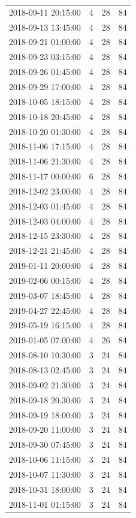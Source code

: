 \begin{tabular}{lrrr}
2018-09-11 20:15:00 & 4 & 28 & 84 \\
2018-09-13 13:45:00 & 4 & 28 & 84 \\
2018-09-21 01:00:00 & 4 & 28 & 84 \\
2018-09-23 03:15:00 & 4 & 28 & 84 \\
2018-09-26 01:45:00 & 4 & 28 & 84 \\
2018-09-29 17:00:00 & 4 & 28 & 84 \\
2018-10-05 18:15:00 & 4 & 28 & 84 \\
2018-10-18 20:45:00 & 4 & 28 & 84 \\
2018-10-20 01:30:00 & 4 & 28 & 84 \\
2018-11-06 17:15:00 & 4 & 28 & 84 \\
2018-11-06 21:30:00 & 4 & 28 & 84 \\
2018-11-17 00:00:00 & 6 & 28 & 84 \\
2018-12-02 23:00:00 & 4 & 28 & 84 \\
2018-12-03 01:45:00 & 4 & 28 & 84 \\
2018-12-03 04:00:00 & 4 & 28 & 84 \\
2018-12-15 23:30:00 & 4 & 28 & 84 \\
2018-12-21 21:45:00 & 4 & 28 & 84 \\
2019-01-11 20:00:00 & 4 & 28 & 84 \\
2019-02-06 00:15:00 & 4 & 28 & 84 \\
2019-03-07 18:45:00 & 4 & 28 & 84 \\
2019-04-27 22:45:00 & 4 & 28 & 84 \\
2019-05-19 16:15:00 & 4 & 28 & 84 \\
2019-01-05 07:00:00 & 4 & 26 & 84 \\
2018-08-10 10:30:00 & 3 & 24 & 84 \\
2018-08-13 02:45:00 & 3 & 24 & 84 \\
2018-09-02 21:30:00 & 3 & 24 & 84 \\
2018-09-18 20:30:00 & 3 & 24 & 84 \\
2018-09-19 18:00:00 & 3 & 24 & 84 \\
2018-09-20 11:00:00 & 3 & 24 & 84 \\
2018-09-30 07:45:00 & 3 & 24 & 84 \\
2018-10-06 11:15:00 & 3 & 24 & 84 \\
2018-10-07 11:30:00 & 3 & 24 & 84 \\
2018-10-31 18:00:00 & 3 & 24 & 84 \\
2018-11-01 01:15:00 & 3 & 24 & 84 \\

\end{tabular}
